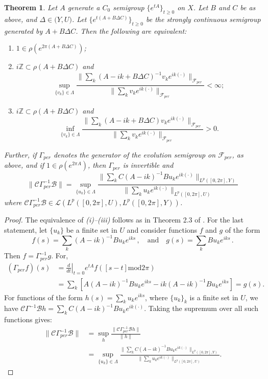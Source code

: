 \documentclass[10pt,psamsfonts,leqno]{siamltex}
\newtheorem{thm}[prop]{Theorem}
\newcommand{\bbZ}{\mathbb{Z}}
\newcommand{\calB}{\mathcal{B}}
\newcommand{\calC}{\mathcal{C}}
\newcommand{\disp}{\displaystyle}
\newcommand{\lb}{\label}
\newcommand{\Gammaper}{\Gamma_{per}}
\newcommand{\Fper}{{\mathcal{F}_{per}}}
\begin{document}
\begin{thm}\lb{LMS-Gearhart+BDeltaC}
Let $A$ generate a $C_0$ semigroup $\{e^{tA}\}_{t\ge0}$ on
$X$.  Let $B$ and $C$ be as above, and $\Delta\in \mathcal(Y,U)$.  Let
$\{e^{t(A+B\Delta C)}\}_{t\ge0}$ be the strongly continuous
semigroup  generated by $A+B\Delta C$.
Then the following are equivalent:
\begin{enumerate}
\item $1\in \rho (e^{2\pi (A+B\Delta C)})$;
\item $i\bbZ \subset \rho (A+B\Delta C)$ \quad and
  \[\disp{  \sup_{\{v_k\}\in\Lambda}
  \frac{\|\sum_k(A-ik+B\Delta C)^{-1}
  v_ke^{ik(\cdot)}\|_\Fper}{\|\sum_k v_k
  e^{ik(\cdot)}\|_\Fper} <\infty;}\]
\item $i\bbZ \subset \rho (A+B\Delta C)$ \quad and
  \[\disp{\inf_{\{v_k\}\in\Lambda}
  \frac{\|\sum_k(A-ik+B\Delta C)v_ke^{ik(\cdot)}\|_\Fper}{\|\sum_k v_k
  e^{ik(\cdot)}\|_\Fper} >0.}\]
\end{enumerate}
Further, if $\Gammaper$ denotes the generator of the evolution
 semigroup on $\Fper$, as above, and if $1\in\rho(e^{2\pi A})$, then
$\Gammaper$ is invertible and
\begin{equation}\lb{NormCGamInvB}
\|\calC\Gammaper^{-1}\calB\|=
\sup_{\{u_k\}\in\Lambda}
     \frac{\|\sum_k C(A-ik)^{-1}Bu_ke^{ik(\cdot)}\|_{L^p([0,2\pi],Y)}}
     {\|\sum_k u_ke^{ik(\cdot)}\|_{L^p([0,2\pi],U)}}
\end{equation}
where $\calC\Gammaper^{-1}\calB\in
\mathcal{L}(L^p([0,2\pi],U),L^p([0,2\pi],Y))$.
\end{thm}

\begin{proof}  The equivalence of {\em (i)--(iii)} follows as in
Theorem 2.3 of \cite{LMS2}.  For the last statement, let $\{u_k\}$ be a
finite set in $U$ and consider functions
$f$ and $g$ of the form
\[
f(s)=\sum_k(A-ik)^{-1}Bu_ke^{iks}\, ,\quad\mbox{and}\quad
g(s)=\sum_kBu_ke^{iks}\, .
\]
Then $f=\Gammaper^{-1}g$.  For,
\begin{align*}
(\Gammaper f)(s)&=
\left.\frac{d}{dt}\right|_{t=0}e^{tA}f([s-t]\mbox{mod}2\pi)\\
&= \sum_k [A(A-ik)^{-1}Bu_ke^{iks}-ik(A-ik)^{-1}Bu_ke^{iks}]=g(s).
\end{align*}
For functions of the form $h(s)=\sum_k u_ke^{iks}$, where
$\{u_k\}_k$ is a finite set in $U$, we have
$\calC\Gamma^{-1}\calB h=\sum_kC(A-ik)^{-1}Bu_ke^{ik(\cdot)}$.
Taking the supremum over all such functions gives:
\begin{align*}
\|\calC\Gammaper^{-1}\calB\|&=
\sup_{h}\frac{\|\calC\Gammaper^{-1}\calB h\|}{\|h\|}\\
&=\sup_{\{u_k\}\in\Lambda}
\frac{\|\sum_k C(A-ik)^{-1}Bu_ke^{ik(\cdot)}\|_{L^p([0,2\pi],Y)}}
{\|\sum_k u_ke^{ik(\cdot)}\|_{L^p([0,2\pi],U)}}.
\end{align*}
\end{proof}
\end{document}

